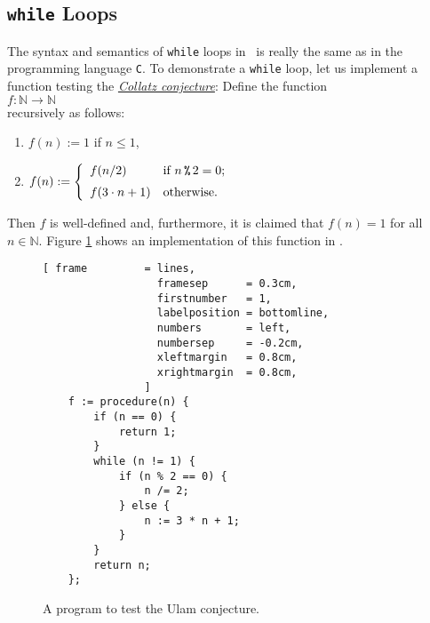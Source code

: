 \subsection{\texttt{while} Loops}
The syntax and semantics of \texttt{while} loops in \setlx\ is really the same as in the programming
language \texttt{C}.  To demonstrate a \texttt{while} loop,
let us implement a function testing the 
\href{http://en.wikipedia.org/wiki/Collatz_conjecture}{\emph{Collatz conjecture}}:  Define the function
\\[0.2cm]
\hspace*{1.3cm}
$f: \mathbb{N} \rightarrow \mathbb{N}$
\\[0.2cm]
recursively as follows:
\begin{enumerate}
\item $f(n) := 1$ \hspace*{2.13cm} if $n \leq 1$,
\item $f(n) := \left\{
       \begin{array}[c]{ll}
         f(n/2)           & \mbox{if $n \,\texttt{\symbol{37}}\, 2 = 0$;} \\[0.2cm]  
         f(3 \cdot n + 1) & \mbox{otherwise.} 
       \end{array}
       \right.
      $ 
\end{enumerate}
Then $f$ is well-defined and, furthermore, it is claimed that $f(n) = 1$ for all $n \in \mathbb{N}$.  Figure
\ref{fig:ulam.stlx} shows an implementation of this function in \setlx.  

\begin{figure}[!ht]
\centering
\begin{Verbatim}[ frame         = lines, 
                  framesep      = 0.3cm, 
                  firstnumber   = 1,
                  labelposition = bottomline,
                  numbers       = left,
                  numbersep     = -0.2cm,
                  xleftmargin   = 0.8cm,
                  xrightmargin  = 0.8cm,
                ]
    f := procedure(n) {
        if (n == 0) {
            return 1;   
        }
        while (n != 1) {
            if (n % 2 == 0) {
                n /= 2;
            } else {
                n := 3 * n + 1;
            }
        }
        return n;
    };
\end{Verbatim}
\vspace*{-0.3cm}
\caption{A program to test the Ulam conjecture.}
\label{fig:ulam.stlx}
\end{figure}

